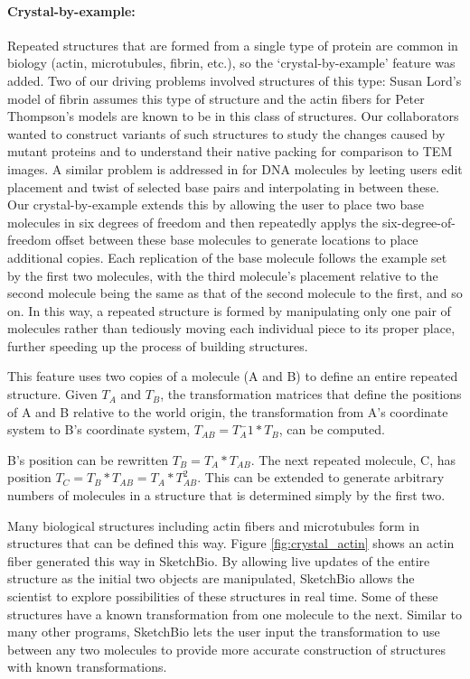 \documentclass[twocolumn]{bmcart}%
\begin{document}
\paragraph*{Crystal-by-example:}
Repeated structures that are formed from a single type of protein are common in biology (actin, microtubules, fibrin, etc.), so the ‘crystal-by-example' feature was added.
Two of our driving problems involved structures of this type: Susan Lord's model of fibrin assumes this type of structure and the actin fibers for Peter Thompson's models are known to be in this class of structures.
Our collaborators wanted to construct variants of such structures to study the changes caused by mutant proteins and to understand their native packing for comparison to TEM images.
A similar problem is addressed in \cite{hornus2013easy} for DNA molecules by leeting users edit placement and twist of selected base pairs and interpolating in between these.
Our crystal-by-example extends this by allowing the user to place two base molecules in six degrees of freedom and then repeatedly applys the six-degree-of-freedom offset between these base molecules to generate locations to place additional copies.
Each replication of the base molecule follows the example set by the first two molecules, with the third molecule's placement relative to the second molecule being the same as that of the second molecule to the first, and so on.
In this way, a repeated structure is formed by manipulating only one pair of molecules rather than tediously moving each individual piece to its proper place, further speeding up the process of building structures.

This feature uses two copies of a molecule (A and B) to define an entire repeated structure.
Given $T_A$ and $T_B$, the transformation matrices that define the positions of A and B relative to the world origin, the transformation from A's coordinate system to B's coordinate system, $T_{AB} = T_A^-1*T_B$, can be computed.

B's position can be rewritten $T_B = T_A*T_{AB}$.  The next repeated molecule, C, has position $T_C = T_B*T_{AB} = T_A*T_{AB}^2$.
This can be extended to generate arbitrary numbers of molecules in a structure that is determined simply by the first two.

Many biological structures including actin fibers and microtubules form in structures that can be defined this way.
Figure \ref{fig:crystal_actin} shows an actin fiber generated this way in SketchBio.
By allowing live updates of the entire structure as the initial two objects are manipulated, SketchBio allows the scientist to explore possibilities of these structures in real time.
Some of these structures have a known transformation from one molecule to the next.
Similar to many other programs, SketchBio lets the user input the transformation to use between any two molecules to provide more accurate construction of structures with known transformations.
\end{document}
